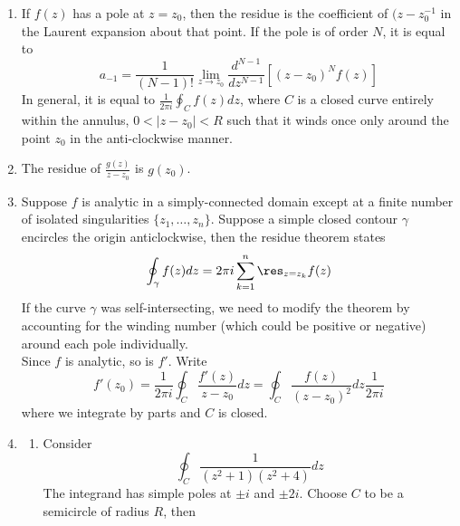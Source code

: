 \documentclass[a4paper]{article}
\begin{document}
\begin{ans}\leavevmode
\begin{enumerate}[label=(\alph*)]
\item If $f(z)$ has a pole at $z=z_0$, then the residue is the coefficient of $(z-z_0^{-1}$ in the Laurent expansion about that point. If the pole is of order $N$, it is equal to
$$a_{-1}=\frac{1}{(N-1)!}\lim_{z\rightarrow z_0}\frac{d^{N-1}}{dz^{N-1}}[(z-z_0)^Nf(z)]$$
In general, it is equal to $\frac{1}{2\pi i}\oint_Cf(z)dz$, where $C$ is a closed curve entirely within the annulus, $0<|z-z_0|<R$ such that it winds once only around the point $z_0$ in the anti-clockwise manner.
\item The residue of $\frac{g(z)}{z-z_0}$ is $g(z_0)$.
\item Suppose $f$ is analytic in a simply-connected domain except at a finite number of isolated singularities $\{z_1,\dots,z_n\}$. Suppose a simple closed contour $\gamma$ encircles the origin anticlockwise, then the residue theorem states
$$\oint_\gamma f(z)dz=2\pi i\sum_{k=1}^n\res_{z=z_k}f(z)$$
If the curve $\gamma$ was self-intersecting, we need to modify the theorem by accounting for the winding number (which could be positive or negative) around each pole individually.\\[5pt]
Since $f$ is analytic, so is $f'$. Write
$$f'(z_0)=\frac{1}{2\pi i}\oint_C\frac{f'(z)}{z-z_0}dz=\oint_C\frac{f(z)}{(z-z_0)^2}dz\frac{1}{2\pi i}$$ 
where we integrate by parts and $C$ is closed.
\item 
\begin{enumerate}[label=(\roman*)]
\item Consider
$$\oint_C\frac{1}{(z^2+1)(z^2+4)}dz$$
The integrand has simple poles at $\pm i$ and $\pm 2i$. Choose $C$ to be a semicircle of radius $R$, then
\begin{center}
\end{center}
\end{enumerate}
\end{enumerate}
\end{ans}
\end{document}
